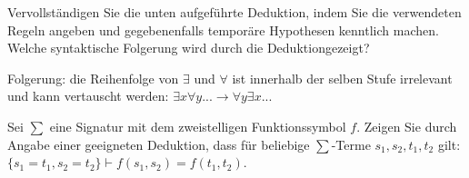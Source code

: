 \documentclass[10pt, a4paper]{exam}
\begin{document}
\begin{questions}

    \question Vervollständigen Sie die unten aufgeführte Deduktion, indem Sie die verwendeten Regeln angeben und gegebenenfalls temporäre Hypothesen kenntlich machen. Welche syntaktische Folgerung wird durch die Deduktiongezeigt?
    \begin{solution}
        \begin{prooftree}
        \end{prooftree}

        Folgerung: die Reihenfolge von $\exists$ und $\forall$ ist innerhalb der selben Stufe irrelevant und kann vertauscht werden: $\exists x\forall y...\rightarrow \forall y\exists x...$
    \end{solution}

    \question Sei $\sum$ eine Signatur mit dem zweistelligen Funktionssymbol $f$. Zeigen Sie durch Angabe einer geeigneten Deduktion, dass für beliebige $\sum$-Terme $s_1,s_2,t_1,t_2$ gilt: $\{s_1=t_1,s_2=t_2\}\vdash f(s_1,s_2)=f(t_1,t_2)$.
    \begin{solution}

        \begin{prooftree}
        \end{prooftree}
    \end{solution}


\end{questions}
\end{document}
